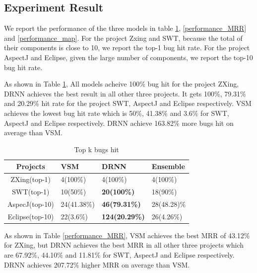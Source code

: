 \subsection{Experiment Result}

We report the performance of the three models in table \ref{performance_top_k}, \ref{performance_MRR} and \ref{performance_map}.
For the project Zxing and SWT, because the total of  their components is close to 10, we report the top-1 bug hit rate.
For the project AspectJ and Eclipse, given the large  number of components, we report the top-10 bug hit rate.

As shown in Table \ref{performance_top_k}, All models acheive 100\%  bug hit for the project ZXing, DRNN achieves the best result in all other three projects. It gets 100\%, 79.31\% and 20.29\% hit rate for the project SWT, AspectJ and Eclipse respectively. 
VSM achieves the lowest bug hit rate which is 50\%, 41.38\% and 3.6\% for SWT, AspectJ and Eclipse respectively. 
DRNN achieve 163.82\% more bugs hit on average than VSM.

 \begin{table}[h]
 	\begin{center}
 		\caption{Top k bugs hit}
 		\label{performance_top_k}
 		
 		\begin{tabular}{c|l|l|l} %
 			 \textbf{Projects} & \textbf{VSM} & \textbf{DRNN} & \textbf{Ensemble} \\
 			\hline\hline
 			ZXing(top-1)& 4(100\%)&4(100\%) &4(100\%) \\
 			
 			SWT(top-1) & 10(50\%) & \textbf{20(100\%)} &18(90\%)\\
 			
 			AspecJ(top-10) & 24(41.38\%)  & \textbf{46(79.31\%)} & 28(48.28)\%\\
 			
 			Eclipse(top-10) &22(3.6\%) & \textbf{124(20.29\%)} & 26(4.26\%)\\
 			
 		\end{tabular}
 	\end{center}
 \end{table}

As shown in Table \ref{performance_MRR}, VSM achieves the best MRR of 43.12\% for ZXing, but DRNN achieves the best MRR in all other three projects which are 67.92\%, 44.10\% and 11.81\% for SWT, AspectJ and Eclipse respectively. 
DRNN achieves 207.72\% higher MRR on average than VSM.

